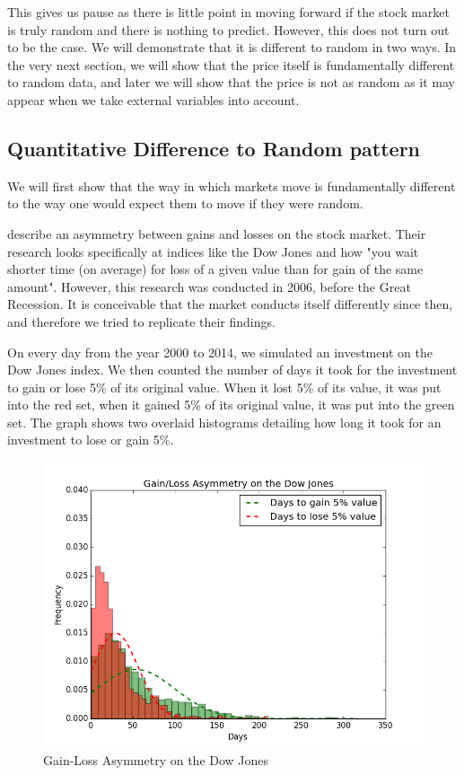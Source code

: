 \documentclass{report}
\begin{document}
This gives us pause as there is little point in moving forward if the stock market is truly random and there is nothing to predict. However, this does not turn out to be the case. We will demonstrate that it is different to random in two ways. In the very next section, we will show that the price itself is fundamentally different to random data, and later we will show that the price is not as random as it may appear when we take external variables into account.

\subsection{Quantitative Difference to Random pattern}

We will first show that the way in which markets move is fundamentally different to the way one would expect them to move if they were random.

\citet{karpio2007gain} describe an asymmetry between gains and losses on the stock market. Their research looks specifically at indices like the Dow Jones and how "you wait shorter time (on average) for loss of a given value than for gain of the same amount". However, this research was conducted in 2006, before the Great Recession. It is conceivable that the market conducts itself differently since then, and therefore we tried to replicate their findings.

On every day from the year 2000 to 2014, we simulated an investment on the Dow Jones index. We then counted the number of days it took for the investment to gain or lose 5\% of its original value. When it lost 5\% of its value, it was put into the red set, when it gained 5\% of its original value, it was put into the green set. The graph shows two overlaid histograms detailing how long it took for an investment to lose or gain 5\%.

\begin{figure}[H]
	\caption{Gain-Loss Asymmetry on the Dow Jones}
	\centerline{\includegraphics[width=\textwidth]{vis/gain_loss_asymmetry.png}}
	\label{fig:gain-loss-asymm}
\end{figure}
\end{document}
